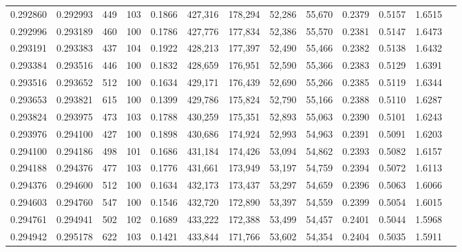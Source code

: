 \begin{tabular}{rrrrrrrrrrrrr}
0.292860 & 0.292993 &   449 & 103 &                                     0.1866 & 427,316 & 178,294 &  52,286 &  55,670 & 0.2379 & 0.5157 & 1.6515 \\
0.292996 & 0.293189 &   460 & 100 &                                     0.1786 & 427,776 & 177,834 &  52,386 &  55,570 & 0.2381 & 0.5147 & 1.6473 \\
0.293191 & 0.293383 &   437 & 104 &                                     0.1922 & 428,213 & 177,397 &  52,490 &  55,466 & 0.2382 & 0.5138 & 1.6432 \\
0.293384 & 0.293516 &   446 & 100 &                                     0.1832 & 428,659 & 176,951 &  52,590 &  55,366 & 0.2383 & 0.5129 & 1.6391 \\
0.293516 & 0.293652 &   512 & 100 &                                     0.1634 & 429,171 & 176,439 &  52,690 &  55,266 & 0.2385 & 0.5119 & 1.6344 \\
0.293653 & 0.293821 &   615 & 100 &                                     0.1399 & 429,786 & 175,824 &  52,790 &  55,166 & 0.2388 & 0.5110 & 1.6287 \\
0.293824 & 0.293975 &   473 & 103 &                                     0.1788 & 430,259 & 175,351 &  52,893 &  55,063 & 0.2390 & 0.5101 & 1.6243 \\
0.293976 & 0.294100 &   427 & 100 &                                     0.1898 & 430,686 & 174,924 &  52,993 &  54,963 & 0.2391 & 0.5091 & 1.6203 \\
0.294100 & 0.294186 &   498 & 101 &                                     0.1686 & 431,184 & 174,426 &  53,094 &  54,862 & 0.2393 & 0.5082 & 1.6157 \\
0.294188 & 0.294376 &   477 & 103 &                                     0.1776 & 431,661 & 173,949 &  53,197 &  54,759 & 0.2394 & 0.5072 & 1.6113 \\
0.294376 & 0.294600 &   512 & 100 &                                     0.1634 & 432,173 & 173,437 &  53,297 &  54,659 & 0.2396 & 0.5063 & 1.6066 \\
0.294603 & 0.294760 &   547 & 100 &                                     0.1546 & 432,720 & 172,890 &  53,397 &  54,559 & 0.2399 & 0.5054 & 1.6015 \\
0.294761 & 0.294941 &   502 & 102 &                                     0.1689 & 433,222 & 172,388 &  53,499 &  54,457 & 0.2401 & 0.5044 & 1.5968 \\
0.294942 & 0.295178 &   622 & 103 &                                     0.1421 & 433,844 & 171,766 &  53,602 &  54,354 & 0.2404 & 0.5035 & 1.5911 \\

\end{tabular}
